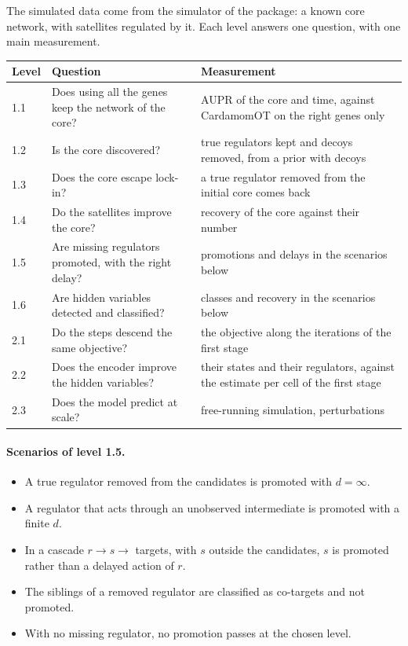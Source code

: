 \documentclass[a4paper, 11pt]{article}
\theoremstyle{plain}
\theoremstyle{remark}
\begin{document}
The simulated data come from the simulator of the package: a known core network, with satellites regulated by it. Each level answers one question, with one main measurement.

\begin{center}
\begin{tabular}{@{}lp{}p{}@{}}
\toprule
Level & Question & Measurement \\
\midrule
1.1 & Does using all the genes keep the network of the core? & AUPR of the core and time, against CardamomOT on the right genes only \\
1.2 & Is the core discovered? & true regulators kept and decoys removed, from a prior with decoys \\
1.3 & Does the core escape lock-in? & a true regulator removed from the initial core comes back \\
1.4 & Do the satellites improve the core? & recovery of the core against their number \\
1.5 & Are missing regulators promoted, with the right delay? & promotions and delays in the scenarios below \\
1.6 & Are hidden variables detected and classified? & classes and recovery in the scenarios below \\
2.1 & Do the steps descend the same objective? & the objective along the iterations of the first stage \\
2.2 & Does the encoder improve the hidden variables? & their states and their regulators, against the estimate per cell of the first stage \\
2.3 & Does the model predict at scale? & free-running simulation, perturbations \\
\bottomrule
\end{tabular}
\end{center}

\paragraph{Scenarios of level 1.5.}
\begin{itemize}[nosep]
\item A true regulator removed from the candidates is promoted with $d = \infty$.
\item A regulator that acts through an unobserved intermediate is promoted with a finite $d$.
\item In a cascade $r \to s \to$ targets, with $s$ outside the candidates, $s$ is promoted rather than a delayed action of $r$.
\item The siblings of a removed regulator are classified as co-targets and not promoted.
\item With no missing regulator, no promotion passes at the chosen level.
\end{itemize}
\end{document}
